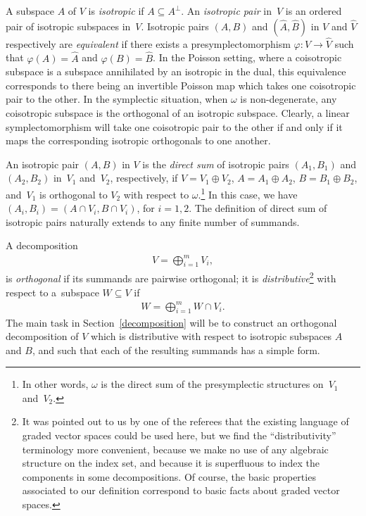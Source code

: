 \documentclass[pdftex]{sigma}
\numberwithin{equation}{section}
\begin{document}
A subspace $A$ of $V$ is \textit{isotropic} if $A \subseteq A^{\perp}$.  An \textit{isotropic pair} in~$V$ is an ordered pair of isotropic subspaces in~$V$. Isotropic pairs $(A,B)$ and $(\hat A, \hat B)$  in $V$ and $\hat V$ respectively are \textit{equivalent} if there exists a presymplectomorphism $\varphi\colon V \rightarrow \hat V$ such that $\varphi(A) = \hat A$ and $\varphi(B) = \hat B$. In the Poisson setting, where a coisotropic subspace is a subspace annihilated by an isotropic in the dual, this equivalence corresponds to there being an invertible Poisson map which takes one coisotropic pair to the other. In the symplectic situation, when $\omega$ is non-degenerate, any coisotropic subspace is the orthogonal of an isotropic subspace. Clearly, a linear symplectomorphism will take one coisotropic pair to the other if and only if it maps the corresponding isotropic orthogonals to one another.

An isotropic pair $(A,B)$ in $V$ is the \textit{direct sum} of isotropic pairs $(A_1,B_1)$ and $(A_2,B_2)$ in~$V_1$ and~$V_2$, respectively, if $V = V_1 \oplus V_2$, $A = A_1 \oplus A_2$, $B = B_1 \oplus B_2$, and~$V_1$ is orthogonal to $V_2$ with respect to $\omega$.\footnote{In other words, $\omega$ is the direct sum of the presymplectic structures on~$V_1$ and~$V_2$.} In this case, we have $(A_i,B_i) = (A \cap V_i, B \cap V_i)$, for $i = 1,2$. The def\/inition of direct sum of isotropic pairs naturally extends to any f\/inite number of summands.

A decomposition
\begin{gather}\label{direct sum}
V = \bigoplus_{i=1}^m V_i,
\end{gather}
is \textit{orthogonal} if its summands are pairwise orthogonal; it is \textit{distributive}\footnote{It was pointed out to us by one of the referees that the existing language of graded vector spaces could be used here, but we f\/ind the ``distributivity'' terminology more convenient, because we make no use of any algebraic structure on the index set, and because it is superf\/luous to index the components in some decompositions. Of course, the basic properties associated to our def\/inition correspond to basic facts about graded vector spaces.}
 with respect to a~subspace $W \subseteq V$ if
\begin{gather*}%
W = \bigoplus_{i=1}^m W \cap V_i.
\end{gather*}
The main task in Section~\ref{decomposition} will be to construct an orthogonal decomposition of $V$ which is distributive with respect to isotropic subspaces $A$ and $B$, and such that  each of the resulting summands has a simple form.
\end{document}
